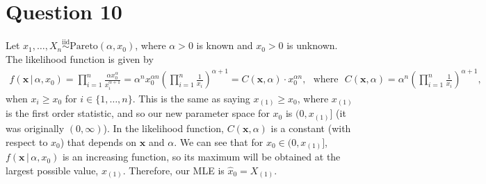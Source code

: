 \documentclass[10pt]{article}
\begin{document}
\section{Question 10} \noindent
Let \(x_1, \ldots, X_n \overset{\text{iid}}{\sim} \mathrm{Pareto}(\alpha, x_0)\), where \(\alpha > 0\) is known and \(x_0 > 0\) is unknown. The likelihood 
function is given by 
\begin{align*}
    f(\mathbf{x} \,|\, \alpha, x_0) 
    = \prod_{i=1}^n \frac{\alpha x_0^{\alpha}}{x_i^{\alpha + 1}}
    = \alpha^n x_0^{\alpha n} \left( \prod_{i=1}^n \frac{1}{x_i} \right)^{\alpha + 1}
    = C(\mathbf{x}, \alpha) \cdot x_0^{\alpha n},
    ~~~\text{where}~~~
    C(\mathbf{x}, \alpha) = \alpha^n \left( \prod_{i=1}^n \frac{1}{x_i} \right)^{\alpha + 1},
\end{align*}
when \(x_i \ge x_0\) for \(i \in \{1, \ldots, n\}\). 
This is the same as saying \(x_{(1)} \ge x_0\), where \(x_{(1)}\) is the first order statistic, and so 
our new parameter space for \(x_0\) is \((0, x_{(1)}]\) (it was originally \((0, \infty)\)).
In the likelihood function, \(C(\mathbf{x}, \alpha)\) is a constant (with respect to \(x_0\)) that depends on \(\mathbf{x}\) and \(\alpha\). 
We can see that for \(x_0 \in (0, x_{(1)}]\), \(f(\mathbf{x} \,|\, \alpha, x_0)\) is an increasing function, so its maximum will be obtained 
at the largest possible value, \(x_{(1)}\). Therefore, our MLE is \(\hat{x}_0 = X_{(1)}\). 

\end{document}
